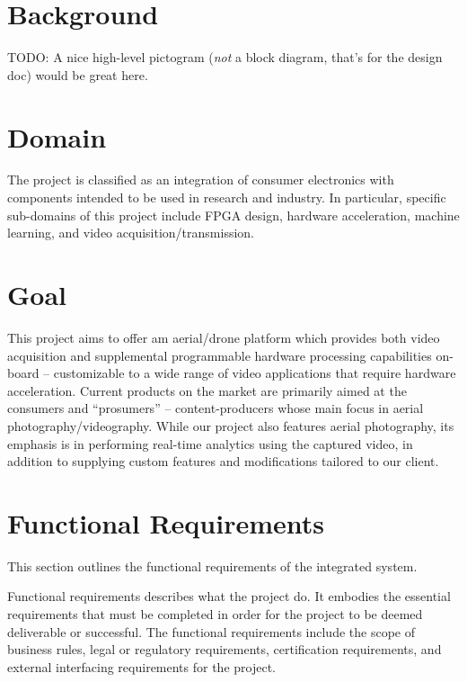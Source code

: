 \documentclass[10pt,letterpaper]{article}
\begin{document}
\section{Background}

% 
% 

TODO: A nice high-level pictogram (\textit{not} a block diagram, that's for the design doc) would be great here.

\section{Domain}

The project is classified as an integration of consumer electronics with components intended to be used in research and industry. In particular, specific sub-domains of this project include FPGA design, hardware acceleration, machine learning, and video acquisition/transmission. 

\section{Goal}

This project aims to offer am aerial/drone platform which provides both video acquisition and supplemental programmable hardware processing capabilities on-board -- customizable to a wide range of video applications that require hardware acceleration. Current products on the market are primarily aimed at the consumers and ``prosumers'' -- content-producers whose main focus in aerial photography/videography. While our project also features aerial photography, its emphasis is in performing real-time analytics using the captured video, in addition to supplying custom features and modifications tailored to our client.

\section{Functional Requirements}\label{section:funcreq}

This section outlines the functional requirements of the integrated system.

Functional requirements describes what the project do. It embodies the essential requirements that must be completed in order for the project to be deemed deliverable or successful. The functional requirements include the scope of business rules, legal or regulatory requirements, certification requirements, and external interfacing requirements for the project.
\end{document}
